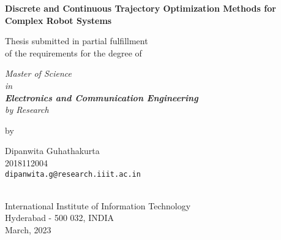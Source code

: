 \thispagestyle{empty}
\begin{center}
\vspace*{1.5cm}
{\Large \bf Discrete and Continuous Trajectory Optimization Methods for Complex Robot Systems}

\vspace*{3.75cm}
{\large Thesis submitted in partial fulfillment\\}
{\large  of the requirements for the degree of \\}

\vspace*{1cm}
{\it {\large Master of Science \\ in \\ \textbf{Electronics and Communication Engineering} \\ by Research}\\}
    

\vspace*{1cm}
{\large by}

\vspace*{5mm}
{\large Dipanwita Guhathakurta\\}
{\large 2018112004\\
{\small \tt dipanwita.g@research.iiit.ac.in}}


\vspace*{4.0cm}
{\\}
{\large International Institute of Information Technology\\}
{\large Hyderabad - 500 032, INDIA\\}
{\large March, 2023\\}
\end{center}